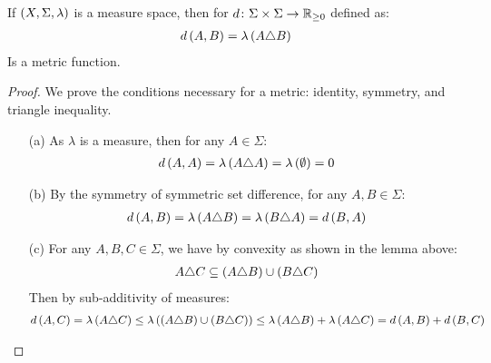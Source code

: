 \documentclass[12pt]{article}
\begin{document}
\begin{theorem}
  If \(\left(X, \Sigma, \lambda\right)\) is a measure space,
  then for \(d \colon \Sigma \times \Sigma \to \mathbb{R}_{\geq 0}\) defined as:
  \begin{align*}
    d\left(A, B\right) = \lambda\left(A \triangle B\right)
  \end{align*}
  Is a metric function.
\end{theorem}
\begin{proof}
  We prove the conditions necessary for a metric:
  identity, symmetry, and triangle inequality.
  \begin{enumerate}
    \item[(a)]
      As \(\lambda\) is a measure, then for any \(A \in \Sigma\):
      \begin{align*}
        d\left(A, A\right)
          = \lambda\left(A \triangle A\right)
          = \lambda\left(\emptyset\right) = 0
      \end{align*}

    \item[(b)]
      By the symmetry of symmetric set difference, for any \(A, B \in \Sigma\):
      \begin{align*}
        d\left(A, B\right)
          = \lambda\left(A \triangle B\right)
          = \lambda\left(B \triangle A\right)
          = d\left(B, A\right)
      \end{align*}

    \item[(c)]
      For any \(A, B, C \in \Sigma\),
      we have by convexity as shown in the lemma above:
      \begin{align*}
        A \triangle C \subseteq
          \left(A \triangle B\right) \cup \left(B \triangle C\right)
      \end{align*}
      Then by sub-additivity of measures:
      \begin{align*}
        d\left(A, C\right)
          = \lambda\left(A \triangle C\right)
          \leq \lambda\left(
                \left(A \triangle B\right) \cup \left(B \triangle C\right)\right)
          \leq
          \lambda\left(A \triangle B\right) + \lambda\left(A \triangle C\right)
          = d\left(A, B\right) + d\left(B, C\right)
      \end{align*}
  \end{enumerate}
\end{proof}

\pagebreak

\printbibliography
\end{document}
